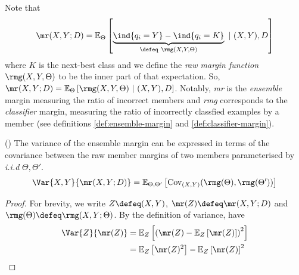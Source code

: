 \documentclass[
    a4paper, %
	fontsize=10pt, %
	twoside=false, %
]{kaobook}
\begin{document}
\begin{titlepage}

Note that
$$
\mr(X, Y;D) = \mathbb{E}_{\Theta}\left[ 
\underbrace{
\ind{q_{i}=Y} - \ind{q_{i}=K} 
}_{
\defeq ~\rmg(X, Y, \Theta) 
}
~|~(X,Y), D \right] 
$$
where $K$ is the next-best class and we define the \textit{raw margin function} $\rmg(X, Y, \Theta)$ to be the inner part of that expectation. So, 
$\mr(X, Y;D) = \mathbb{E}_{\Theta}\left[ 
\rmg(X, Y, \Theta) 
~|~(X,Y), D \right]$. Notably, \textit{mr} is the \textit{ensemble} margin measuring the ratio of incorrect members and \textit{rmg} corresponds to the \textit{classifier} margin, measuring the ratio of incorrectly classfied examples by a member (see definitions \ref{def:ensemble-margin} and \ref{def:classifier-margin}).

\begin{theorem} (\cite{breiman_RandomForests_2001})
The variance of the ensemble margin can be expressed in terms of the covariance between the raw member margins of two members parameterised by \textit{i.i.d} $\Theta, \Theta'$.
	$$
	\Var{X,Y}{\mr(X,Y;D)} = \mathbb{E}_{\Theta, \Theta'}\left[ \text{Cov}_{(X,Y)}(\rmg(\Theta), \rmg(\Theta') ) \right] 
	$$
\end{theorem}
\begin{proof}
	For brevity, we write
	  $Z \defeq (X,Y)$,
	 $\mr(Z) \defeq \mr(X,Y;D)$ and
	 $\rmg(\Theta) \defeq \rmg(X,Y;\Theta)$.
By the definition of variance, have
\begin{align*}
\Var{Z}{\mr(Z)} &= \mathbb{E}_{Z}\left[ \left(\mr(Z) - \mathbb{E}_{Z}\left[ \mr(Z) \right]\right) ^2 \right]  \\
&= \mathbb{E}_{Z}\left[ \mr(Z)^2 \right] - \mathbb{E}_{Z}\left[ \mr(Z) \right] ^2 \\
\end{align*}


\end{proof}
\end{titlepage}
\end{document}
